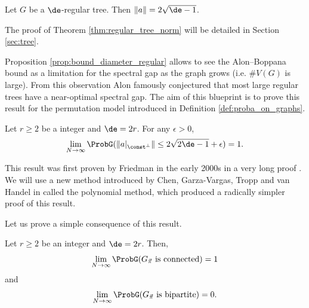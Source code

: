 \begin{theorem}
  \label{thm:regular_tree_norm}
  \notready
  Let $G$ be a $\de$-regular tree. Then $\|a\| = 2 \sqrt{\de-1}$.
\end{theorem}

The proof of Theorem \ref{thm:regular_tree_norm} will be detailed in Section \ref{sec:tree}.

Proposition \ref{prop:bound_diameter_regular} allows to see the Alon--Boppana
bound as a limitation for the spectral gap as the graph grows (i.e. $\# V(G)$ is large).
From this observation Alon famously conjectured that most large regular trees
have a near-optimal spectral gap. The aim of this blueprint is to prove this result
for the permutation model introduced in Definition \ref{def:proba_on_graphs}.

\begin{theorem}
  \label{thm:Friedman}
  \notready
  Let $r \geq 2$ be a integer and $\de = 2r$.
  For any $\epsilon > 0$,
\begin{equation}
    \lim_{N \rightarrow \infty}
    \ProbG(\|a|_{\const^\perp}\| \leq 2 \sqrt{2\de -1} + \epsilon) = 1.
\end{equation}
\end{theorem}

This result was first proven by Friedman in the early 2000s in a very long proof \cite{friedman2003}.
We will use a new method introduced by Chen, Garza-Vargas, Tropp and van Handel in \cite{chen2025}
called the polynomial method, which produced a radically simpler proof of this result.

Let us prove a simple consequence of this result.

\begin{proposition}
  \label{prop:random_connected_non_bipartite}
  Let $r \geq 2$ be an integer and $\de = 2r$.
  Then,
  \begin{equation}
    \lim_{N \rightarrow \infty} \ProbG(G_{\vec{\pi}} \text{ is connected})=1
  \end{equation}
  and
    \begin{equation}
    \lim_{N \rightarrow \infty} \ProbG(G_{\vec{\pi}} \text{ is bipartite})=0.
  \end{equation}
\end{proposition}


